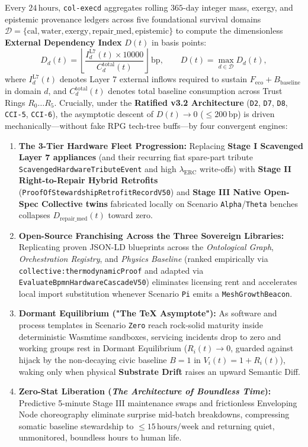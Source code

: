 Every $24\,\mathrm{hours}$, \texttt{col-execd} aggregates rolling $365\text{-day}$ integer mass, exergy, and epistemic provenance ledgers across five
foundational survival domains $\mathcal{D} = \{\mathrm{cal}, \mathrm{water}, \mathrm{exergy}, \mathrm{repair\_med}, \mathrm{epistemic}\}$ to compute the
dimensionless \textbf{External Dependency Index} $D(t)$ in basis points:
\begin{equation}
D_d(t) = \left\lfloor \frac{I_d^{\mathrm{L7}}(t) \times 10000}{C_d^{\mathrm{total}}(t)} \right\rfloor\,\mathrm{bp},
\qquad
D(t) = \max_{d \in \mathcal{D}} D_d(t),
\label{eq:omega-dependency-index}
\end{equation}
where $I_d^{\mathrm{L7}}(t)$ denotes Layer 7 external inflows required to sustain $F_{\mathrm{eco}} + B_{\mathrm{baseline}}$ in domain $d$, and
$C_d^{\mathrm{total}}(t)$ denotes total baseline consumption across Trust Rings $R_0 \dots R_5$. Crucially, under the \textbf{Ratified v3.2 Architecture}
(\texttt{D2}, \texttt{D7}, \texttt{D8}, \texttt{CCI-5}, \texttt{CCI-6}), the asymptotic descent of $D(t) \to 0$ ($\le 200\,\mathrm{bp}$) is driven
mechanically---without fake RPG tech-tree buffs---by four convergent engines:
\begin{enumerate}
    \item \textbf{The 3-Tier Hardware Fleet Progression:} Replacing \textbf{Stage I Scavenged Layer 7 appliances} (and their recurring fiat spare-part
    tribute \texttt{ScavengedHardwareTributeEvent} and high $\lambda_{\mathrm{ERC}}$ write-offs) with \textbf{Stage II Right-to-Repair Hybrid Retrofits}
    (\texttt{ProofOfStewardshipRetrofitRecordV50}) and \textbf{Stage III Native Open-Spec Collective twins} fabricated locally on Scenario
    \texttt{Alpha}/\texttt{Theta} benches collapses $D_{\mathrm{repair\_med}}(t)$ toward zero.
    \item \textbf{Open-Source Franchising Across the Three Sovereign Libraries:} Replicating proven JSON-LD blueprints across the \textit{Ontological
    Graph}, \textit{Orchestration Registry}, and \textit{Physics Baseline} (ranked empirically via \texttt{collective:thermodynamicProof} and adapted via
    \texttt{EvaluateBpmnHardwareCascadeV50}) eliminates licensing rent and accelerates local import substitution whenever Scenario \texttt{Pi} emits a
    \texttt{MeshGrowthBeacon}.
    \item \textbf{Dormant Equilibrium ("The TeX Asymptote"):} As software and process templates in Scenario \texttt{Zero} reach rock-solid maturity inside
    deterministic Wasmtime sandboxes, servicing incidents drop to zero and working groups rest in Dormant Equilibrium ($R_i(t) \to 0$, guarded against
    hijack by the non-decaying civic baseline $B = 1$ in $V_i(t) = 1 + R_i(t)$), waking only when physical \textbf{Substrate Drift} raises an upward
    Semantic Diff.
    \item \textbf{Zero-Stat Liberation (\textit{The Architecture of Boundless Time}):} Predictive 5-minute Stage III maintenance swaps and frictionless
    Enveloping Node choreography eliminate surprise mid-batch breakdowns, compressing somatic baseline stewardship to $\le 15\,\mathrm{hours/week}$ and
    returning quiet, unmonitored, boundless hours to human life.
\end{enumerate}

